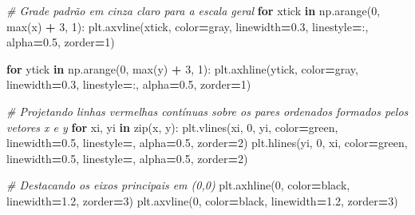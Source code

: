 \documentclass[
]{book}
\newenvironment{Shaded}{\begin{snugshade}}{\end{snugshade}}
\newcommand{\BuiltInTok}[1]{#1}
\newcommand{\CommentTok}[1]{\textcolor[rgb]{0.56,0.35,0.01}{\textit{#1}}}
\newcommand{\ControlFlowTok}[1]{\textcolor[rgb]{0.13,0.29,0.53}{\textbf{#1}}}
\newcommand{\DecValTok}[1]{\textcolor[rgb]{0.00,0.00,0.81}{#1}}
\newcommand{\FloatTok}[1]{\textcolor[rgb]{0.00,0.00,0.81}{#1}}
\newcommand{\KeywordTok}[1]{\textcolor[rgb]{0.13,0.29,0.53}{\textbf{#1}}}
\newcommand{\NormalTok}[1]{#1}
\newcommand{\OperatorTok}[1]{\textcolor[rgb]{0.81,0.36,0.00}{\textbf{#1}}}
\newcommand{\StringTok}[1]{\textcolor[rgb]{0.31,0.60,0.02}{#1}}
\begin{document}
\begin{Shaded}
\begin{Highlighting}[]
\CommentTok{\# Grade padrão em cinza claro para a escala geral}
\ControlFlowTok{for}\NormalTok{ xtick }\KeywordTok{in}\NormalTok{ np.arange(}\DecValTok{0}\NormalTok{, }\BuiltInTok{max}\NormalTok{(x) }\OperatorTok{+} \DecValTok{3}\NormalTok{, }\DecValTok{1}\NormalTok{):}
\NormalTok{    plt.axvline(xtick, color}\OperatorTok{=}\StringTok{\textquotesingle{}gray\textquotesingle{}}\NormalTok{, linewidth}\OperatorTok{=}\FloatTok{0.3}\NormalTok{, linestyle}\OperatorTok{=}\StringTok{\textquotesingle{}:\textquotesingle{}}\NormalTok{, alpha}\OperatorTok{=}\FloatTok{0.5}\NormalTok{, zorder}\OperatorTok{=}\DecValTok{1}\NormalTok{)}

\ControlFlowTok{for}\NormalTok{ ytick }\KeywordTok{in}\NormalTok{ np.arange(}\DecValTok{0}\NormalTok{, }\BuiltInTok{max}\NormalTok{(y) }\OperatorTok{+} \DecValTok{3}\NormalTok{, }\DecValTok{1}\NormalTok{):}
\NormalTok{    plt.axhline(ytick, color}\OperatorTok{=}\StringTok{\textquotesingle{}gray\textquotesingle{}}\NormalTok{, linewidth}\OperatorTok{=}\FloatTok{0.3}\NormalTok{, linestyle}\OperatorTok{=}\StringTok{\textquotesingle{}:\textquotesingle{}}\NormalTok{, alpha}\OperatorTok{=}\FloatTok{0.5}\NormalTok{, zorder}\OperatorTok{=}\DecValTok{1}\NormalTok{)}

\CommentTok{\# Projetando linhas vermelhas contínuas sobre os pares ordenados formados pelos vetores x e y}
\ControlFlowTok{for}\NormalTok{ xi, yi }\KeywordTok{in} \BuiltInTok{zip}\NormalTok{(x, y):}
\NormalTok{    plt.vlines(xi, }\DecValTok{0}\NormalTok{, yi, color}\OperatorTok{=}\StringTok{\textquotesingle{}green\textquotesingle{}}\NormalTok{, linewidth}\OperatorTok{=}\FloatTok{0.5}\NormalTok{, linestyle}\OperatorTok{=}\StringTok{\textquotesingle{}{-}{-}\textquotesingle{}}\NormalTok{, alpha}\OperatorTok{=}\FloatTok{0.5}\NormalTok{, zorder}\OperatorTok{=}\DecValTok{2}\NormalTok{)}
\NormalTok{    plt.hlines(yi, }\DecValTok{0}\NormalTok{, xi, color}\OperatorTok{=}\StringTok{\textquotesingle{}green\textquotesingle{}}\NormalTok{, linewidth}\OperatorTok{=}\FloatTok{0.5}\NormalTok{, linestyle}\OperatorTok{=}\StringTok{\textquotesingle{}{-}{-}\textquotesingle{}}\NormalTok{, alpha}\OperatorTok{=}\FloatTok{0.5}\NormalTok{, zorder}\OperatorTok{=}\DecValTok{2}\NormalTok{)}

\CommentTok{\# Destacando os eixos principais em (0,0)}
\NormalTok{plt.axhline(}\DecValTok{0}\NormalTok{, color}\OperatorTok{=}\StringTok{\textquotesingle{}black\textquotesingle{}}\NormalTok{, linewidth}\OperatorTok{=}\FloatTok{1.2}\NormalTok{, zorder}\OperatorTok{=}\DecValTok{3}\NormalTok{)}
\NormalTok{plt.axvline(}\DecValTok{0}\NormalTok{, color}\OperatorTok{=}\StringTok{\textquotesingle{}black\textquotesingle{}}\NormalTok{, linewidth}\OperatorTok{=}\FloatTok{1.2}\NormalTok{, zorder}\OperatorTok{=}\DecValTok{3}\NormalTok{)}


\end{Highlighting}
\end{Shaded}
\end{document}
